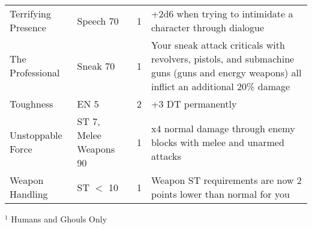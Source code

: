 \begin{longtable}{|p{3.3cm}|p{3.1cm}|p{1.2cm}|p{8.4cm}|}
Terrifying Presence & Speech 70 & 1 & +2d6 when trying to intimidate a character through dialogue  \\
The Professional & Sneak 70 & 1 & Your sneak attack criticals with revolvers, pistols, and submachine guns (guns and energy weapons) all inflict an additional 20\% damage \\
Toughness & EN 5 & 2 & +3 DT permanently \\
Unstoppable Force & ST 7, Melee Weapons 90 & 1 & x4 normal damage through enemy blocks with melee and unarmed attacks \\
Weapon Handling & ST $<$ 10 & 1 & Weapon ST requirements are now 2 points lower than normal for you \\

\hline
\end{longtable}
$^1$ Humans and Ghouls Only
